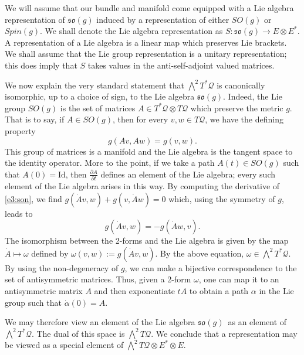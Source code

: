 \documentclass[11pt]{article}
\theoremstyle{remark}
\begin{document}
We will assume that our bundle and manifold come equipped with a
Lie algebra representation of $\ensuremath{\mathfrak{so}(g)}$ induced by a representation of
either $SO(g)$ or $Spin(g)$. We shall denote the Lie algebra 
representation as $S: \ensuremath{\mathfrak{so}(g)} \to E\otimes \ensuremath{{E}^{*}}$.  A representation of
a Lie algebra is
a linear map which  preserves Lie brackets. We shall assume that the
Lie group representation is a unitary representation; this does  imply that $S$
takes values in the anti-self-adjoint valued matrices.

We now explain the very standard statement that 
$\ensuremath{\bigwedge^{2}{\ensuremath{T^{*} \ensuremath{\mathcal{Q}}}}}$ is canonically isomorphic, up to a choice of sign, to 
the Lie algebra \ensuremath{\mathfrak{so}(g)}. 
Indeed, the Lie group $SO(g)$ is the set of matrices
$A \in \ensuremath{T^{*} \ensuremath{\mathcal{Q}}} \otimes \ensuremath{T \ensuremath{\mathcal{Q}}}$ which preserve
the metric $g$. That is to say, if $A \in SO(g)$, then for every 
$v, w \in \ensuremath{T \ensuremath{\mathcal{Q}}}$, we have the defining property 
\begin{equation} \label{e3:son}
g(Av, Aw) =
g(v,w).
\end{equation}
This group of matrices is a manifold and the 
Lie algebra is the tangent space to the identity operator. 
More to the point, if we take a path $A(t) \in SO(g)$ 
such that $A(0) = \text{Id}$,  then $\ensuremath{\frac{\partial {A}}{\partial {t}}}$ defines an element of the
Lie algebra;  every such element of the Lie algebra arises in this
way. 
By computing
the derivative of \eqref{e3:son}, we find $
g(\dot A v, w) + g(v, \dot A w) = 0$ which, using the symmetry of $g$,
leads to 
\[
g(\dot A v, w) = -g(\dot A w, v).
\]
The isomorphism between the 2-forms and the Lie algebra is given by
 the map $\dot A \mapsto \omega$ defined by
 $\omega (v, w) \ensuremath{:=}  g(\dot A v, w)$.  By the above
equation, $\omega \in \ensuremath{\bigwedge^{2}{\ensuremath{T^{*} \ensuremath{\mathcal{Q}}}}}$. By using the non-degeneracy of
$g$, we can make a bijective correspondence to the set of antisymmetric
matrices. Thus, given a 2-form $\omega$, one can map it to an antisymmetric
 matrix $A$ and then exponentiate $tA$ to obtain a path $\alpha$ in
 the Lie group such that $\dot{\alpha}(0) = A$. 
 

We may therefore view an element of the Lie algebra \ensuremath{\mathfrak{so}(g)}\ as an element of 
$\ensuremath{\bigwedge^{2}{\ensuremath{T^{*} \ensuremath{\mathcal{Q}}}}}$. The dual
of this space is $\ensuremath{\bigwedge^{2}{\ensuremath{T \ensuremath{\mathcal{Q}}}}}$. We conclude that a
representation may be viewed as a special element of
$\ensuremath{\bigwedge^{2}{\ensuremath{T \ensuremath{\mathcal{Q}}}}} \otimes \ensuremath{{\ensuremath{E}}^{*}} \otimes \ensuremath{E}$.  
\end{document}

